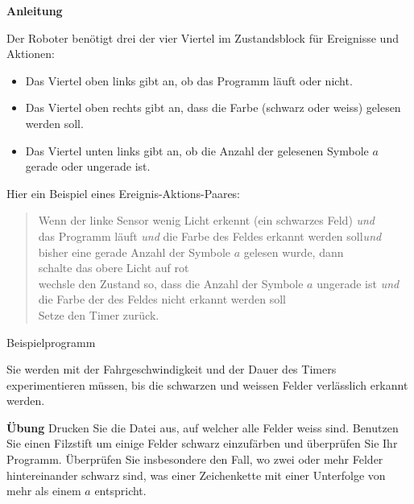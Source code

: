\textbf{Anleitung}

Der Roboter benötigt drei der vier Viertel im Zustandsblock für Ereignisse und Aktionen:

\begin{itemize}
\item Das Viertel oben links gibt an, ob das Programm läuft oder nicht. 
\item Das Viertel oben rechts gibt an, dass die Farbe (schwarz oder weiss) gelesen werden soll. 
\item Das Viertel unten links gibt an, ob die Anzahl der gelesenen Symbole $a$ gerade oder ungerade ist.
\end{itemize}

Hier ein Beispiel eines Ereignis-Aktions-Paares: 


\begin{quote}
	Wenn der linke Sensor wenig Licht erkennt (ein schwarzes Feld) \emph{und}\\
	\hspace*{1em} das Programm läuft \emph{und}
	die Farbe des Feldes erkannt werden soll\emph{und}\\
	\hspace*{1em} bisher eine gerade Anzahl der Symbole $a$ gelesen wurde, dann\\
	\hspace*{2em} schalte das obere Licht auf rot\\
	\hspace*{2em} wechsle den Zustand so, dass die Anzahl der Symbole $a$ ungerade ist \emph{und}\\
	\hspace*{4em} die Farbe der des Feldes nicht erkannt werden soll \\
	\hspace*{2em} Setze den Timer zurück. 
\end{quote}

{\raggedleft \hfill Beispielprogramm }

Sie werden mit der Fahrgeschwindigkeit und der Dauer des Timers experimentieren müssen, bis die schwarzen und weissen Felder verlässlich erkannt werden. 

\textbf{Übung} Drucken Sie die Datei  aus, auf welcher alle Felder weiss sind. Benutzen Sie einen Filzstift um einige Felder schwarz einzufärben und überprüfen Sie Ihr Programm. Überprüfen Sie insbesondere den Fall, wo zwei oder mehr Felder hintereinander schwarz sind, was einer Zeichenkette mit einer Unterfolge von mehr als einem $a$ entspricht.

